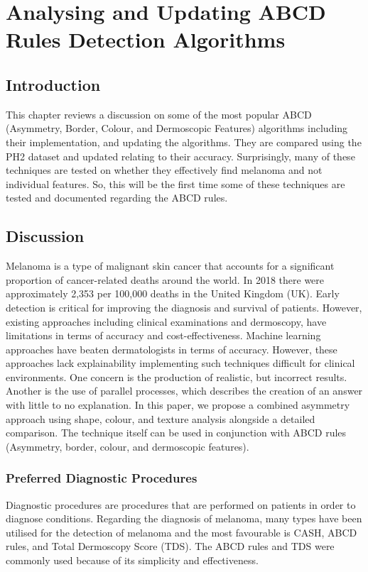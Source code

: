 \chapter{Analysing and Updating ABCD Rules Detection Algorithms}

\section{Introduction}
This chapter reviews a discussion on some of the most popular ABCD (Asymmetry, Border, Colour, and Dermoscopic Features) algorithms including their implementation, and updating the algorithms. They are compared using the PH2 dataset and updated relating to their accuracy. Surprisingly, many of these techniques are tested on whether they effectively find melanoma and not individual features. So, this will be the first time some of these techniques are tested and documented regarding the ABCD rules.

\section{Discussion}
Melanoma is a type of malignant skin cancer that accounts for a significant proportion of cancer-related deaths around the world. In 2018 there were approximately 2,353 per 100,000 deaths in the United Kingdom (UK)\cite{UK2019}. Early detection is critical for improving the diagnosis and survival of patients. However, existing approaches including clinical examinations and dermoscopy, have limitations in terms of accuracy and cost-effectiveness\cite{Takiddin2021}. Machine learning approaches have beaten dermatologists in terms of accuracy\cite{Andre2017}. However, these approaches lack explainability implementing such techniques difficult for clinical environments\cite{Fan2017}. One concern is the production of realistic, but incorrect results\cite{Ghorbani2019}. Another is the use of parallel processes, which describes the creation of an answer with little to no explanation. In this paper, we propose a combined asymmetry approach using shape, colour, and texture analysis alongside a detailed comparison. The technique itself can be used in conjunction with ABCD rules (Asymmetry, border, colour, and dermoscopic features).

\subsection{Preferred Diagnostic Procedures}
Diagnostic procedures are procedures that are performed on patients in order to diagnose conditions. Regarding the diagnosis of melanoma, many types have been utilised for the detection of melanoma and the most favourable is CASH, ABCD rules, and Total Dermoscopy Score (TDS). The ABCD rules and TDS were commonly used because of its simplicity and effectiveness.

